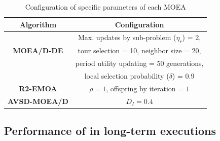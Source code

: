 \begin{table}[t]
\centering
\caption{Configuration of specific parameters of each MOEA}
\label{tab:Parametrization}
\begin{scriptsize}
\begin{tabular}{c|c}
\hline
\textbf{Algorithm} & \textbf{Configuration} \\ \hline
\multirow{3}{*}{
\textbf{MOEA/D-DE}} & Max. updates by sub-problem ($\eta_r$) = 2, \\
 & tour selection = 10,   neighbor size = 20, \\
 & period utility updating = 50 generations, \\
 & local selection probability ($\delta$) = 0.9\\ \hline
\textbf{R2-EMOA} & $\rho=1$, offspring by iteration = $1$ \\ \hline
\textbf{AVSD-MOEA/D} & $D_I=0.4$ \\ \hline
\end{tabular}
\end{scriptsize}
\end{table}








\subsection{Performance of \MOEAS{} in long-term executions}


